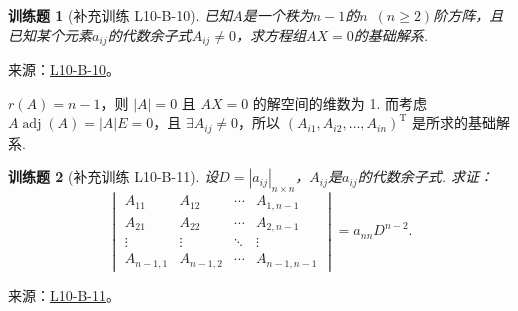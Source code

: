 \documentclass[12pt,fontset=fandol]{ctexart}
\newtheorem{exercise}{训练题}[section]
\begin{document}
\begin{exercise}[补充训练 L10-B-10]\label{prob:L10-B-10}
已知$A$是一个秩为$n-1$的$n\enspace(n \geqslant 2)$阶方阵，且已知某个元素$a_{ij}$的代数余子式$A_{ij} \neq 0$，求方程组$AX=0$的基础解系.
\end{exercise}
\noindent 来源：\href{https://github.com/yhwu-is/Linear-Algebra-Left-Undone/blob/new/%E8%AE%B2%E4%B9%89/%E4%B8%93%E9%A2%98/10%20%E8%A1%8C%E5%88%97%E5%BC%8F.tex}{L10-B-10}。
\begin{solve}
$r(A) = n-1$，则 $\lvert A \rvert = 0$ 且 $AX = 0$ 的解空间的维数为 1. 而考虑 $A\operatorname{adj}(A) = \lvert A \rvert E = 0$，且 $\exists A_{ij} \neq 0$，所以 $(A_{i1}, A_{i2}, \ldots , A_{in})^{\mathrm{T}}$ 是所求的基础解系.
\end{solve}

\begin{exercise}[补充训练 L10-B-11]\label{prob:L10-B-11}
设$D=|a_{ij}|_{n \times n}$，$A_{ij}$是$a_{ij}$的代数余子式. 求证：
        \[\begin{vmatrix}
                A_{11}    & A_{12}    & \cdots & A_{1,n-1}   \\
                A_{21}    & A_{22}    & \cdots & A_{2,n-1}   \\
                \vdots    & \vdots    & \ddots & \vdots      \\
                A_{n-1,1} & A_{n-1,2} & \cdots & A_{n-1,n-1}
            \end{vmatrix}=a_{nn}D^{n-2}.\]
\end{exercise}
\noindent 来源：\href{https://github.com/yhwu-is/Linear-Algebra-Left-Undone/blob/new/%E8%AE%B2%E4%B9%89/%E4%B8%93%E9%A2%98/10%20%E8%A1%8C%E5%88%97%E5%BC%8F.tex}{L10-B-11}。
\end{document}
